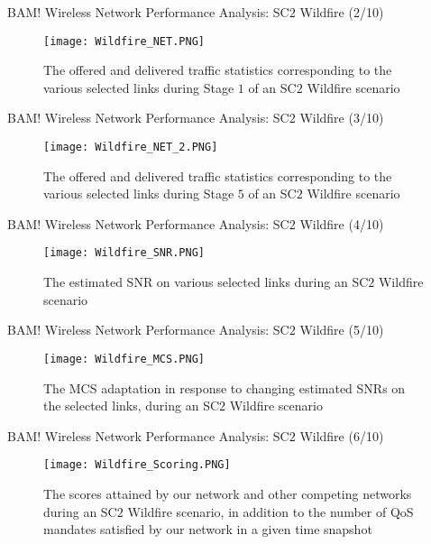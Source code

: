 \documentclass{beamer}
\begin{document}
\begin{frame}{BAM! Wireless Network Performance Analysis: SC$2$ Wildfire (2/10)}
\begin{figure}
    \centering
    \texttt{[image: Wildfire\_NET.PNG]}
    \caption{The offered and delivered traffic statistics corresponding to the various selected links during Stage $1$ of an SC$2$ Wildfire scenario}
    \label{fig:20}
\end{figure}
\end{frame}
\begin{frame}{BAM! Wireless Network Performance Analysis: SC$2$ Wildfire (3/10)}
\begin{figure}
    \centering
    \texttt{[image: Wildfire\_NET\_2.PNG]}
    \caption{The offered and delivered traffic statistics corresponding to the various selected links during Stage $5$ of an SC$2$ Wildfire scenario}
    \label{fig:21}
\end{figure}
\end{frame}
\begin{frame}{BAM! Wireless Network Performance Analysis: SC$2$ Wildfire (4/10)}
\begin{figure}
    \centering
    \texttt{[image: Wildfire\_SNR.PNG]}
    \caption{The estimated SNR on various selected links during an SC$2$ Wildfire scenario}
    \label{fig:22}
\end{figure}
\end{frame}
\begin{frame}{BAM! Wireless Network Performance Analysis: SC$2$ Wildfire (5/10)}
\begin{figure}
    \centering
    \texttt{[image: Wildfire\_MCS.PNG]}
    \caption{The MCS adaptation in response to changing estimated SNRs on the selected links, during an SC$2$ Wildfire scenario}
    \label{fig:23}
\end{figure}
\end{frame}
\begin{frame}{BAM! Wireless Network Performance Analysis: SC$2$ Wildfire (6/10)}
\begin{figure}
    \centering
    \texttt{[image: Wildfire\_Scoring.PNG]}
    \caption{The scores attained by our network and other competing networks during an SC$2$ Wildfire scenario, in addition to the number of QoS mandates satisfied by our network in a given time snapshot}
    \label{fig:24}
\end{figure}
\end{frame}
\end{document}

